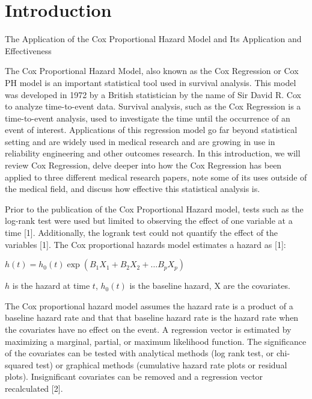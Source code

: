 \documentclass[
  letterpaper,
  DIV=11,
  numbers=noendperiod]{scrreprt}
\author{}
\date{}
\begin{document}
\ifdefined\Shaded\renewenvironment{Shaded}{\begin{tcolorbox}[boxrule=0pt, enhanced, interior hidden, borderline west={3pt}{0pt}{shadecolor}, breakable, sharp corners, frame hidden]}{\end{tcolorbox}}\fi

\hypertarget{introduction}{%
\chapter{Introduction}\label{introduction}}

The Application of the Cox Proportional Hazard Model and Its Application
and Effectiveness

The Cox Proportional Hazard Model, also known as the Cox Regression or
Cox PH model is an important statistical tool used in survival analysis.
This model was developed in 1972 by a British statistician by the name
of Sir David R. Cox to analyze time-to-event data. Survival analysis,
such as the Cox Regression is a time-to-event analysis, used to
investigate the time until the occurrence of an event of interest.
Applications of this regression model go far beyond statistical setting
and are widely used in medical research and are growing in use in
reliability engineering and other outcomes research. In this
introduction, we will review Cox Regression, delve deeper into how the
Cox Regression has been applied to three different medical research
papers, note some of its uses outside of the medical field, and discuss
how effective this statistical analysis is.

Prior to the publication of the Cox Proportional Hazard model, tests
such as the log-rank test were used but limited to observing the effect
of one variable at a time {[}1{]}. Additionally, the logrank test could
not quantify the effect of the variables {[}1{]}. The Cox proportional
hazards model estimates a hazard as {[}1{]}:

\(h(t)=h_0(t) \exp \left(B_1 X_1+B_2 X_2+\ldots B_p X_p\right)\)

\(h\) is the hazard at time \(t\), \(h_0(t)\) is the baseline hazard,
\(\mathrm{X}\) are the covariates.

The Cox proportional hazard model assumes the hazard rate is a product
of a baseline hazard rate and that that baseline hazard rate is the
hazard rate when the covariates have no effect on the event. A
regression vector is estimated by maximizing a marginal, partial, or
maximum likelihood function. The significance of the covariates can be
tested with analytical methods (log rank test, or chi-squared test) or
graphical methods (cumulative hazard rate plots or residual plots).
Insignificant covariates can be removed and a regression vector
recalculated {[}2{]}.
\end{document}
